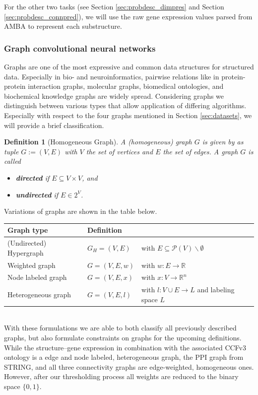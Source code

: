 \documentclass[]{article}
\newtheorem{mydef}{Definition}
\begin{document}
For the other two tasks (see Section \ref{sec:probdesc_dimpres} and Section \ref{sec:probdesc_connpred}), we will use the raw gene expression values parsed from AMBA to represent each substructure.

\subsubsection{Graph convolutional neural networks}
\label{sec:graphconv}
Graphs are one of the most expressive and common data structures for structured data. Especially in bio- and neuroinformatics, pairwise relations like in protein-protein interaction graphs, molecular graphs, biomedical ontologies, and biochemical knowledge graphs are widely spread. Considering graphs we distinguish between various types that allow application of differing algorithms. Especially with respect to the four graphs mentioned in Section \ref{sec:datasets}, we will provide a brief classification.\\

\begin{mydef}[Homogeneous Graph]
	A (homogeneous) graph $G$ is given by as tuple $G:=(V,E)$ with $V$ the set of vertices and $E$ the set of edges. A graph $G$ is called
	\begin{itemize}
		\item  \textbf{directed} if $E\subseteq V\times V$, and
		\item \textbf{undirected} if $E\in 2^V$.
	\end{itemize}
\end{mydef}

Variations of graphs are shown in the table below.

{
\renewcommand{\arraystretch}{1.5}
\begin{tabular}{lll}
	Graph type&Definition&\\
	\hline
	(Undirected) Hypergraph&$G_H=(V,E)$&with $E\subseteq\mathcal{P}(V)\backslash\emptyset$\\
	Weighted graph&$G=(V,E,w)$& with $w:E\rightarrow \mathbb{R}$\\
	Node labeled graph&$G=(V,E,x)$&with $x:V\rightarrow\mathbb{R}^n$\\
	Heterogeneous graph&$G=(V,E,l)$&with $l:V\cup E\rightarrow L$ and labeling space $L$\\
\end{tabular}
}\\

With these formulations we are able to both classify all previously described graphs, but also formulate constraints on graphs for the upcoming definitions. While the structure--gene expression in combination with the associated CCFv3 ontology is a edge and node labeled, heterogeneous graph, the PPI graph from STRING, and all three connectivity graphs are edge-weighted, homogeneous ones. However, after our thresholding process all weights are reduced to the binary space $\{0,1\}$.\\
\end{document}
